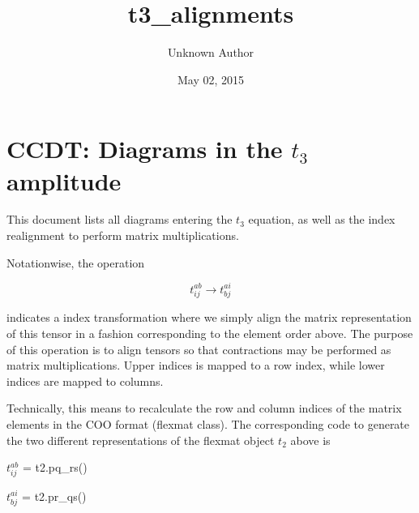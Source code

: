\documentclass[letterpaper,10pt,english]{/Users/kinealicegulbrandsen/anaconda/lib/python2.7/site-packages/sphinx/texinputs/sphinxhowto}
\title{t3\_alignments}
\date{May 02, 2015}
\author{Unknown Author}
\begin{document}
        
            \maketitle
        

        


        
        \section{CCDT: Diagrams in the \(t_3\)
amplitude}\label{ccdt-diagrams-in-the-tux5f3-amplitude}This document lists all diagrams entering the \(t_3\) equation, as well
as the index realignment to perform matrix multiplications.

Notationwise, the operation

\[ t^{ab}_{ij} \rightarrow t^{ai}_{bj} \]

indicates a index transformation where we simply align the matrix
representation of this tensor in a fashion corresponding to the element
order above. The purpose of this operation is to align tensors so that
contractions may be performed as matrix multiplications. Upper indices
is mapped to a row index, while lower indices are mapped to columns.

Technically, this means to recalculate the row and column indices of the
matrix elements in the COO format (flexmat class). The corresponding
code to generate the two different representations of the flexmat object
\(t_2\) above is

\(t^{ab}_{ij}\) = t2.pq\_rs()

\(t^{ai}_{bj}\) = t2.pr\_qs()
\end{document}
